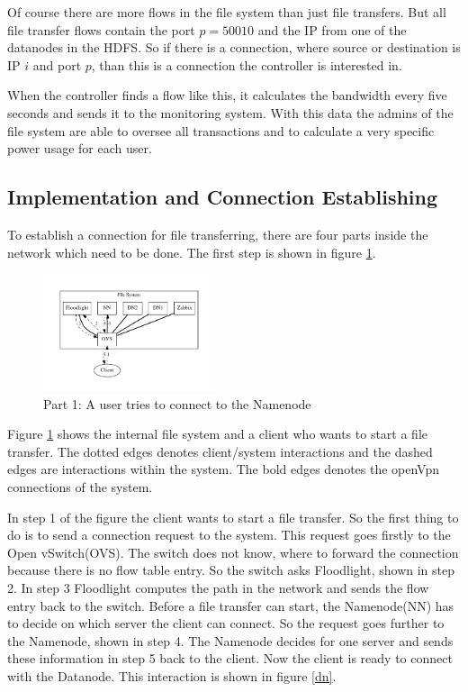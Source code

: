  Of course there are more flows in the file system than just file transfers. But all file transfer flows contain the port $p=50010$ and the IP from one of the datanodes in the HDFS. So if there is a connection, where source or destination is IP $i$ and port $p$, than this is a connection the controller is interested in.
 
 When the controller finds a flow like this, it calculates the bandwidth every five seconds and sends it to the monitoring system. With this data the admins of the file system are able to oversee all transactions and to calculate a very specific power usage for each user. 
 
 \subsection{Implementation and Connection Establishing}               

To establish a connection for file transferring, there are four parts inside the network which need to be done. The first step is shown in figure \ref{nn}.
 
\begin{figure}[htp]
\centering
\includegraphics[width=0.45\textwidth]{img/connectionToNamenode} 
\caption{Part 1: A user tries to connect to the Namenode}
\label{nn}
\end{figure}

Figure \ref{nn} shows the internal file system and a client who wants to start a file transfer. The dotted edges denotes client/system interactions and the dashed edges are interactions within the system. The bold edges denotes the openVpn connections of the system.

In step 1 of the figure the client wants to start a file transfer. So the first thing to do is to send a connection request to the system. This request goes firstly to the Open vSwitch(OVS). The switch does not know, where to forward the connection because there is no flow table entry. So the switch asks Floodlight, shown in step 2. In step 3 Floodlight computes the path in the network and sends the flow entry back to the switch. Before a file transfer can start, the Namenode(NN) has to decide on which server the client can connect. So the request goes further to the Namenode, shown in step 4. The Namenode decides for one server and sends these information in step 5 back to the client. Now the client is ready to connect with the Datanode. This interaction is shown in figure \ref{dn}.

